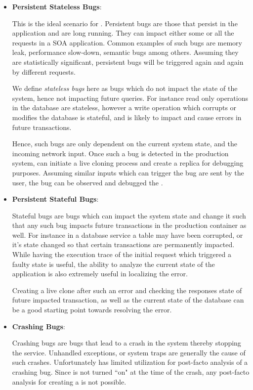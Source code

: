 \begin{itemize}
	
	\item \textbf{Persistent Stateless Bugs}: 
	
	This is the ideal scenario for \parikshan.
	Persistent bugs are those that persist in the application and are long running. 
	They can impact either some or all the requests in a SOA application.
	Common examples of such bugs are memory leak, performance slow-down, semantic bugs among others.
	Assuming they are statistically significant, persistent bugs will be triggered again and again by different requests.
	
	We define \emph{stateless bugs} here as bugs which do not impact the state of the system, hence not impacting future queries. 
	For instance read only operations in the database are stateless, however a write operation which corrupts or modifies the database is stateful, and is likely to impact and cause errors in future transactions.
	
	Hence, such bugs are only dependent on the current system state, and the incoming network input.
	Once such a bug is detected in the production system, \parikshan can initiate a live cloning process and create a replica for debugging purposes. 
	Assuming similar inputs which can trigger the bug are sent by the user, the bug can be observed and debugged the \debugcontainer.
	
	\item \textbf{Persistent Stateful Bugs}:
	
	Stateful bugs are bugs which can impact the system state and change it such that any such bug impacts future transactions in the production container as well.
	For instance in a database service a table may have been corrupted, or it's state changed so that certain transactions are permanently impacted. 
	While having the execution trace of the initial request which triggered a faulty state is useful, the ability to analyze the current state of the application is also extremely useful in localizing the error.
	
	Creating a live clone after such an error and checking the responses state of future impacted transaction, as well as the current state of the database can be a good starting point towards resolving the error. 
	
	\item \textbf{Crashing Bugs}: 
	
	Crashing bugs are bugs that lead to a crash in the system thereby stopping the service.
	Unhandled exceptions, or system traps are generally the cause of such crashes.
	Unfortunately \parikshan has limited utilization for post-facto analysis of a crashing bug. 
	Since \parikshan is not turned ``on" at the time of the crash, any post-facto analysis for creating a \debugcontainer is not possible.

	
\end{itemize} 

